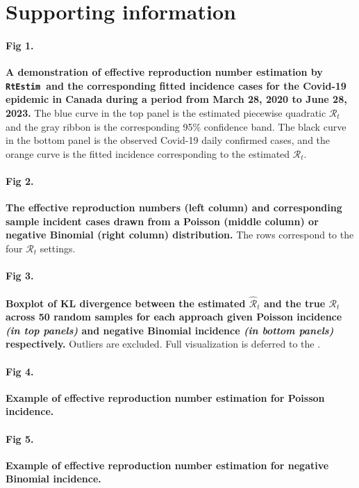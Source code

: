 \documentclass[10pt,letterpaper]{article}
\def\RtEstim{\texttt{RtEstim}}
\def\calR{\mathcal{R}}
\begin{document}
\section*{Supporting information}

\paragraph*{Fig 1.}
\label{fig:intro-fig}
{\bf A demonstration of effective reproduction number estimation 
by \RtEstim\ and the corresponding fitted incidence cases for the Covid-19 epidemic 
in Canada during a period from March 28, 2020 to June 28, 2023.}
The blue curve in the top panel is the estimated piecewise
quadratic $\calR_t$ and the gray ribbon is the corresponding 95\% confidence band. 
The black curve in the bottom panel is the observed Covid-19 daily confirmed 
cases, and the orange curve is the fitted incidence 
corresponding to the estimated $\calR_t$.

\paragraph*{Fig 2.}
\label{fig:samples}
{\bf The effective reproduction numbers (left column) and corresponding
sample incident cases drawn from a Poisson (middle column) or negative
Binomial (right column) distribution.} The rows correspond to the four
$\calR_t$ settings.

\paragraph*{Fig 3.}
\label{fig:kl-res}
{\bf Boxplot of KL divergence between the estimated 
$\hat{\calR}_t$ and the true $\calR_t$ across 50 random samples for 
each approach given Poisson incidence \textit{(in top panels)} and negative 
Binomial incidence \textit{(in bottom panels)} respectively.}  
Outliers are excluded. Full visualization is deferred to the .

\paragraph*{Fig 4.}
\label{fig:pois-est}
{\bf Example of effective reproduction number estimation for Poisson incidence.}

\paragraph*{Fig 5.}
\label{fig:nb-est}
{\bf Example of effective reproduction number estimation for negative Binomial
incidence.}
\end{document}
